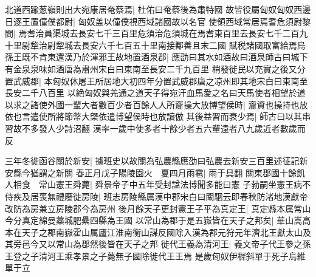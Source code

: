 北道西踰葱嶺則出大宛康居奄蔡焉|{
	杜佑曰奄蔡後為肅特國}
故皆役屬匈奴匈奴西邊日逐王置僮僕都尉|{
	匈奴盖以僮僕視西域諸國故以名官}
使領西域常居焉耆危須尉黎間|{
	焉耆治員渠城去長安七千三百里危須治危須城在焉耆東百里去長安七千二百九十里尉犂治尉犂城去長安六千七百五十里南接鄯善且末二國}
賦税諸國取富給焉烏孫王既不肯東還漢乃於渾邪王故地置酒泉郡|{
	應劭曰其水如酒故曰酒泉師古曰城下有金泉泉味如酒唐為肅州宋白曰東南至長安二千九百里}
稍發徙民以充實之後又分置武威郡|{
	本匈奴休屠王所居地大初四年分置武威郡唐之凉州即其地宋白曰東南至長安二千八百里}
以絶匈奴與羌通之道天子得宛汗血馬愛之名曰天馬使者相望於道以求之諸使外國一輩大者數百少者百餘人人所齎操大放博望侯時|{
	齎資也操持也放依也言遣使所將節幣大槩依遣博望侯時也放讀倣}
其後益習而衰少焉|{
	師古曰以其串習故不多發人少詩沼翻}
漢率一歲中使多者十餘少者五六輩遠者八九歲近者數歲而反

三年冬徙函谷關於新安|{
	據班史以故關為弘農縣應劭曰弘農去新安三百里述征記新安縣今猶謂之新關}
春正月戊子陽陵園火　夏四月雨雹|{
	雨于具翻}
關東郡國十餘飢人相食　常山憲王舜薨|{
	舜景帝子中五年受封諡法博聞多能曰憲}
子勃嗣坐憲王病不侍疾及居喪無禮廢徙房陵|{
	班志房陵縣属漢中郡宋白曰闞駰云即春秋防渚地漢獻帝改防為房兼立房陵郡今為房州}
後月餘天子更封憲王子平為真定王|{
	真定縣本属常山今分真定綿曼藁城肥纍四縣為王國}
以常山為郡于是五嶽皆在天子之邦矣|{
	華山嵩高本在天子之郡南嶽霍山属廬江淮南衡山謀反國除入漢為郡元狩元年濟北王獻太山及其旁邑今又以常山為郡然後皆在天子之邦}
徙代王義為清河王|{
	義文帝子代王參之孫王登之子清河王乘孝景之子薨無子國除徙代王王焉}
是歲匈奴伊穉斜單于死子烏維單于立

